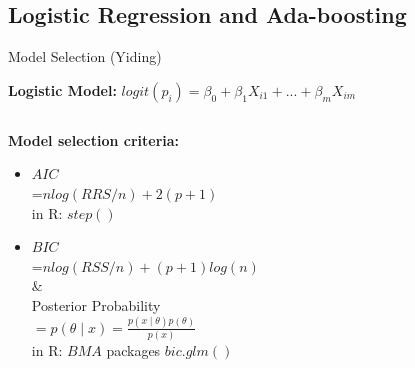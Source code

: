 \documentclass[table]{beamer}\usepackage[]{graphicx}\usepackage[]{color}
\begin{document}

\subsection{Logistic Regression and Ada-boosting}

\begin{frame}{Model Selection (Yiding)}
\begin{minipage}{\textwidth}
{\bf Logistic Model:}
     $logit(p_i)=\beta_0+\beta_1X_{i1}+...+\beta_mX_{im}$
\end{minipage}
     \begin{columns}[t] %
     \begin{column}[T]{5cm}
     {\fontsize{0.3cm}{1em}\selectfont
     {\bf Model selection criteria:}\\
     \begin{itemize}
     \item $AIC$\\
     =$nlog(RRS/n)+2(p+1)$\\
     in R: $step()$\\[2\baselineskip]
     \item $BIC$\\
    =$nlog(RSS/n)+(p+1)log(n)$\\
      \&\\
    Posterior Probability\\
    $=p(\theta \mid x)=\frac{p(x\mid\theta)p(\theta)}{p(x)}$\\
    in R: $BMA$ packages $bic.glm()$
    \end{itemize}
     }
     \end{column}
     \begin{column}[T]{7cm}
     \begin{table}[ht]
\centering
{}
\end{table}



\end{column}
\end{columns}
\end{frame}
\end{document}
